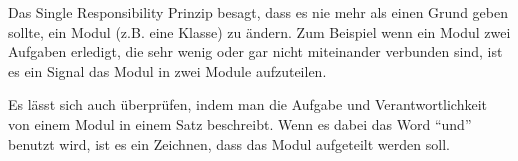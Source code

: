 Das Single Responsibility Prinzip besagt, dass es nie mehr als einen Grund geben sollte,
ein Modul (z.B. eine Klasse) zu ändern. Zum Beispiel wenn ein Modul zwei Aufgaben erledigt, die sehr wenig 
oder gar nicht miteinander verbunden sind, ist es ein Signal das Modul in zwei Module aufzuteilen.

Es lässt sich auch überprüfen, indem man die Aufgabe und Verantwortlichkeit von einem Modul 
in einem Satz beschreibt. Wenn es dabei das Word ``und'' benutzt wird, ist es ein Zeichnen, dass
das Modul aufgeteilt werden soll.



